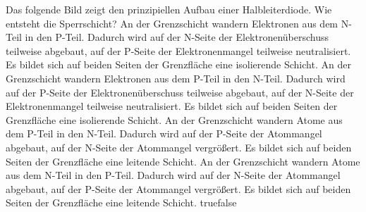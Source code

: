     {Das folgende Bild zeigt den prinzipiellen Aufbau einer Halbleiterdiode. Wie entsteht die Sperrschicht?}
    {An der Grenzschicht wandern Elektronen aus dem N-Teil in den P-Teil. Dadurch wird auf der N-Seite der Elektronenüberschuss teilweise abgebaut, auf der P-Seite der Elektronenmangel teilweise neutralisiert. Es bildet sich auf beiden Seiten der Grenzfläche eine isolierende Schicht.}
    {An der Grenzschicht wandern Elektronen aus dem P-Teil in den N-Teil. Dadurch wird auf der P-Seite der Elektronenüberschuss teilweise abgebaut, auf der N-Seite der Elektronenmangel teilweise neutralisiert. Es bildet sich auf beiden Seiten der Grenzfläche eine isolierende Schicht.}
    {An der Grenzschicht wandern Atome aus dem P-Teil in den N-Teil. Dadurch wird auf der P-Seite der Atommangel abgebaut, auf der N-Seite der Atommangel vergrößert. Es bildet sich auf beiden Seiten der Grenzfläche eine leitende Schicht.}
    {An der Grenzschicht wandern Atome aus dem N-Teil in den P-Teil. Dadurch wird auf der N-Seite der Atommangel abgebaut, auf der P-Seite der Atommangel vergrößert. Es bildet sich auf beiden Seiten der Grenzfläche eine leitende Schicht.}
    {true}{false}